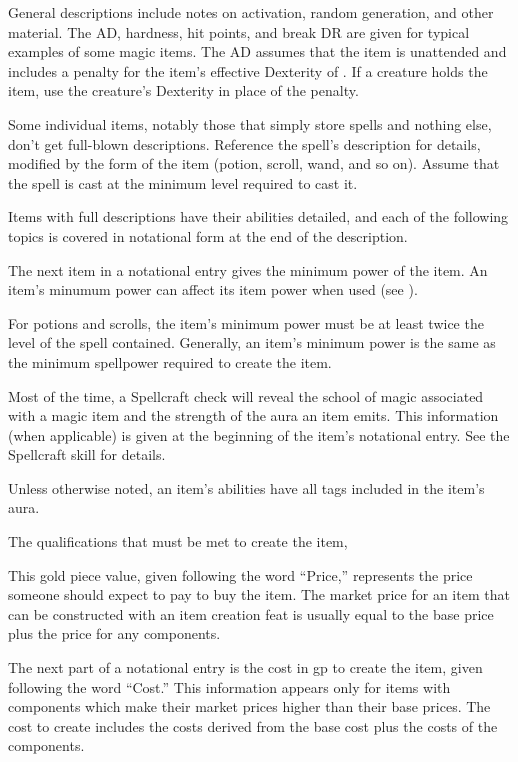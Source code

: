     General descriptions include notes on activation, random generation, and other material.
    The AD, hardness, hit points, and break DR are given for typical examples of some magic items.
    The AD assumes that the item is unattended and includes a  penalty for the item's effective Dexterity of .
    If a creature holds the item, use the creature's Dexterity in place of the  penalty.

    Some individual items, notably those that simply store spells and nothing else, don't get full-blown descriptions.
    Reference the spell's description for details, modified by the form of the item (potion, scroll, wand, and so on).
    Assume that the spell is cast at the minimum level required to cast it.

    Items with full descriptions have their abilities detailed, and each of the following topics is covered in notational form at the end of the description.

     The next item in a notational entry gives the minimum power of the item.
    An item's minumum power can affect its item power when used (see ).

    For potions and scrolls, the item's minimum power must be at least twice the level of the spell contained.
    Generally, an item's minimum power is the same as the minimum spellpower required to create the item.

     Most of the time, a Spellcraft check will reveal the school of magic associated with a magic item and the strength of the aura an item emits.
    This information (when applicable) is given at the beginning of the item's notational entry.
    See the Spellcraft skill for details.

     Unless otherwise noted, an item's abilities have all tags included in the item's aura.

     The qualifications that must be met to create the item, %

     This gold piece value, given following the word ``Price,'' represents the price someone should expect to pay to buy the item.
    The market price for an item that can be constructed with an item creation feat is usually equal to the base price plus the price for any components.

     The next part of a notational entry is the cost in gp to create the item, given following the word ``Cost.'' This information appears only for items with components which make their market prices higher than their base prices.
    The cost to create includes the costs derived from the base cost plus the costs of the components.

